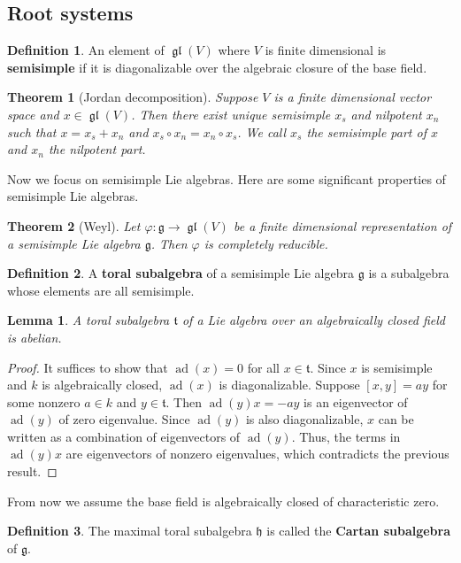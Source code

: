 \documentclass[12pt]{report}
\newtheorem{theorem}{Theorem}[section]
\newtheorem{lemma}{Lemma}[section]
\theoremstyle{remark}
\theoremstyle{definition}
\newtheorem{definition}{Definition}[section]
\newcommand{\gl}{\operatorname{\mathfrak{gl}}}
\newcommand{\ad}{\operatorname{ad}}
\begin{document}
    \subsection{Root systems}
    \begin{definition}
        An element of $\gl(V)$ where $V$ is finite dimensional is \textbf{semisimple} if it is diagonalizable over the algebraic closure of the base field.
    \end{definition}
    \begin{theorem}[Jordan decomposition]
        Suppose $V$ is a finite dimensional vector space and $x\in\gl(V)$. Then there exist unique semisimple $x_s$ and nilpotent $x_n$ such that $x=x_s+x_n$ and $x_s\circ x_n=x_n\circ x_s$. We call $x_s$ the \textup{semisimple part of $x$} and $x_n$ the \textup{nilpotent} part. 
    \end{theorem}
    Now we focus on semisimple Lie algebras. Here are some significant properties of semisimple Lie algebras.
    \begin{theorem}[Weyl]
        Let $\varphi:\mathfrak g\to\gl(V)$ be a finite dimensional representation of a semisimple Lie algebra $\mathfrak g$. Then $\varphi$ is completely reducible.
    \end{theorem}
    \begin{definition}
        A \textbf{toral subalgebra} of a semisimple Lie algebra $\mathfrak g$ is a subalgebra whose elements are all semisimple.
    \end{definition}
    \begin{lemma}
        A toral subalgebra $\mathfrak t$ of a Lie algebra over an algebraically closed field is abelian. 
    \end{lemma}
    \begin{proof}
        It suffices to show that $\ad(x)=0$ for all $x\in\mathfrak t$. Since $x$ is semisimple and $k$ is algebraically closed, $\ad(x)$ is diagonalizable. Suppose $[x, y]=ay$ for some nonzero $a\in k$ and $y\in\mathfrak t$. Then $\ad(y)x=-ay$ is an eigenvector of $\ad(y)$ of zero eigenvalue. Since $\ad(y)$ is also diagonalizable, $x$ can be written as a combination of eigenvectors of $\ad(y)$. Thus, the terms in $\ad(y)x$ are eigenvectors of nonzero eigenvalues, which contradicts the previous result.
    \end{proof}
    From now we assume the base field is algebraically closed of characteristic zero.
    \begin{definition}
        The maximal toral subalgebra $\mathfrak h$ is called the \textbf{Cartan subalgebra} of $\mathfrak g$.
    \end{definition}
\end{document}
